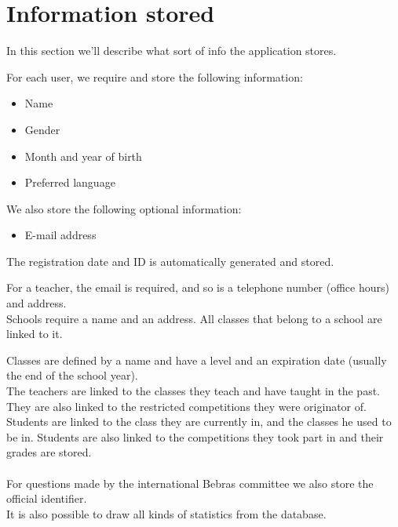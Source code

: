 
\section*{Information stored}
In this section we'll describe what sort of info the application stores.

For each user, we require and store the following information:\\
\begin{itemize}
\item Name
\item Gender
\item Month and year of birth
\item Preferred language
\end{itemize} 


We also store the following optional information:
\begin{itemize}
\item E-mail address
\end{itemize}


The registration date and ID is automatically generated and stored.

For a teacher, the email is required, and so is a telephone number (office hours) and address.
\\
Schools require a name and an address. All classes that belong to a school are linked to it.

Classes are defined by a name and have a level and an expiration date (usually the end of the school year). \\

The teachers are linked to the classes they teach and have taught in the past. They are also linked to the restricted competitions they were originator of. Students are linked to the class they are currently in, and the classes he used to be in. Students are also linked to the competitions they took part in and their grades are stored. 
\\ \\
For questions made by the international Bebras committee we also store the official identifier.\\
It is also possible to draw all kinds of statistics from the database.

